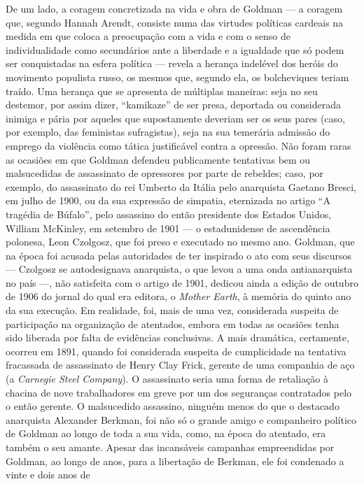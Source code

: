De um lado, a coragem concretizada na vida e obra de Goldman --- a
coragem que, segundo Hannah Arendt, consiste numa das virtudes políticas
cardeais na medida em que coloca a preocupação com a vida e com o senso
de individualidade como secundários ante a liberdade e a igualdade que
só podem ser conquistadas na esfera política --- revela a herança
indelével dos heróis do movimento populista russo, os mesmos que,
segundo ela, os bolcheviques teriam traído. Uma herança que se apresenta
de múltiplas maneiras: seja no seu destemor, por assim dizer,
``kamikaze'' de ser presa, deportada ou considerada inimiga e pária por
aqueles que supostamente deveriam ser os seus pares (caso, por exemplo,
das feministas sufragistas), seja na sua temerária admissão do emprego
da violência como tática justificável contra a opressão. Não foram raras
as ocasiões em que Goldman defendeu publicamente tentativas bem ou
malsucedidas de assassinato de opressores por parte de rebeldes; caso,
por exemplo, do assassinato do rei Umberto da Itália pelo anarquista
Gaetano Bresci, em julho de 1900, ou da sua expressão de simpatia,
eternizada no artigo ``A tragédia de Búfalo'', pelo assassino do então
presidente dos Estados Unidos, William McKinley, em setembro de 1901 ---
o estadunidense de ascendência polonesa, Leon Czolgosz, que foi preso e
executado no mesmo ano. Goldman, que na época foi acusada pelas
autoridades de ter inspirado o ato com seus discursos --- Czolgosz se
autodesignava anarquista, o que levou a uma onda antianarquista no país
---, não satisfeita com o artigo de 1901, dedicou ainda a edição de
outubro de 1906 do jornal do qual era editora, o \emph{Mother Earth}, à
memória do quinto ano da sua execução. Em realidade, foi, mais de uma
vez, considerada suspeita de participação na organização de atentados,
embora em todas as ocasiões tenha sido liberada por falta de evidências
conclusivas. A mais dramática, certamente, ocorreu em 1891, quando foi
considerada suspeita de cumplicidade na tentativa fracassada de
assassinato de Henry Clay Frick, gerente de uma companhia de aço (a
\emph{Carnegie Steel Company}). O assassinato seria uma forma de
retaliação à chacina de nove trabalhadores em greve por um dos
seguranças contratados pelo o então gerente. O malsucedido assassino,
ninguém menos do que o destacado anarquista Alexander Berkman, foi não
só o grande amigo e companheiro político de Goldman ao longo de toda a
sua vida, como, na época do atentado, era também o seu amante. Apesar
das incansáveis campanhas empreendidas por Goldman, ao longo de anos,
para a libertação de Berkman, ele foi condenado a vinte e dois anos de

